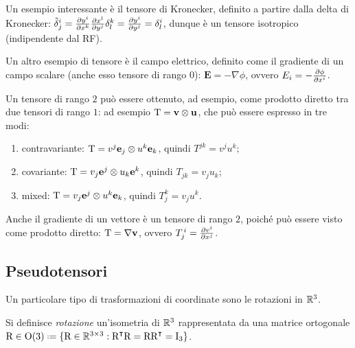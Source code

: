 \begin{example}
	Un esempio interessante è il tensore di Kronecker, definito a partire dalla delta di Kronecker: $ \tilde{\delta}^i_j = \frac{\partial y^i}{\partial x^k} \frac{\partial x^l}{\partial y^j} \delta^k_l = \frac{\partial y^i}{\partial y^j} = \delta^i_l $, dunque è un tensore isotropico (indipendente dal RF).
\end{example}

\begin{example}
	Un altro esempio di tensore è il campo elettrico, definito come il gradiente di un campo scalare (anche esso tensore di rango $ 0 $): $ \mathbf{E} = -\nabla\phi $, ovvero $ E_i = - \frac{\partial \phi}{\partial x^i} $.
\end{example}

\begin{example}
	Un tensore di rango $ 2 $ può essere ottenuto, ad esempio, come prodotto diretto tra due tensori di rango $ 1 $: ad esempio $ \mathbf{\text{T}} = \mathbf{v} \otimes \mathbf{u} $, che può essere espresso in tre modi:
	\begin{enumerate}
		\item contravariante: $ \mathbf{\text{T}} = v^j \mathbf{e}_j \otimes u^k \mathbf{e}_k $, quindi $ T^{jk} = v^j u^k $;
		\item covariante: $ \mathbf{\text{T}} = v_j \mathbf{e}^j \otimes u_k \mathbf{e}^k $, quindi $ T_{jk} = v_j u_k $;
		\item mixed: $ \mathbf{\text{T}} = v_j \mathbf{e}^j \otimes u^k \mathbf{e}_k $, quindi $ T_j^k = v_j u^k $.
	\end{enumerate}
\end{example}

\begin{example}
	Anche il gradiente di un vettore è un tensore di rango $ 2 $, poiché può essere visto come prodotto diretto: $ \mathbf{\text{T}} = \nabla\mathbf{v} $, ovvero $ T^{\,i}_j = \frac{\partial v^i}{\partial x^j} $.
\end{example}


\subsection{Pseudotensori}


Un particolare tipo di trasformazioni di coordinate sono le rotazioni in $ \mathbb{R}^3 $.

\begin{definition}
	Si definisce \textit{rotazione} un'isometria di $ \mathbb{R}^3 $ rappresentata da una matrice ortogonale $ \tens{R} \in \Ot \defeq \{\tens{R} \in \R^{3\times3} : \tens{R}^{\intercal}\tens{R} = \tens{R}\tens{R}^{\intercal} = \tens{I}_3 \} $.
\end{definition}

